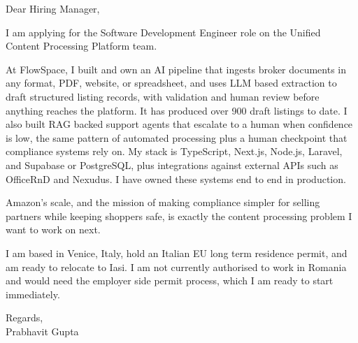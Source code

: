 \documentclass[a4paper,11pt]{article}
\begin{document}
Dear Hiring Manager,

I am applying for the Software Development Engineer role on the Unified Content Processing Platform team.

At FlowSpace, I built and own an AI pipeline that ingests broker documents in any format, PDF, website, or spreadsheet, and uses LLM based extraction to draft structured listing records, with validation and human review before anything reaches the platform. It has produced over 900 draft listings to date. I also built RAG backed support agents that escalate to a human when confidence is low, the same pattern of automated processing plus a human checkpoint that compliance systems rely on. My stack is TypeScript, Next.js, Node.js, Laravel, and Supabase or PostgreSQL, plus integrations against external APIs such as OfficeRnD and Nexudus. I have owned these systems end to end in production.

Amazon's scale, and the mission of making compliance simpler for selling partners while keeping shoppers safe, is exactly the content processing problem I want to work on next.

I am based in Venice, Italy, hold an Italian EU long term residence permit, and am ready to relocate to Iasi. I am not currently authorised to work in Romania and would need the employer side permit process, which I am ready to start immediately.

Regards,\\
Prabhavit Gupta
\end{document}
